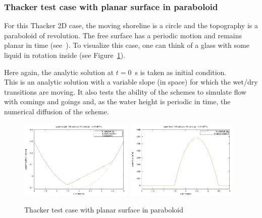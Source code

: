 \documentclass[a4paper, 11pt]{article}
\begin{document}
\subsubsection{Thacker test case with planar surface in paraboloid}
\label{ThackerParabBench}
For this Thacker 2D case, the moving shoreline is a circle
and the topography is a paraboloid of revolution. The free surface has a periodic motion and
 remains planar in time (see~\citep[§~4.2.2]{Delestre13}).
To visualize this case, one can think of a glass with some liquid in rotation inside (see Figure~\ref{FigThacker}). 

Here again, the analytic solution at $t=0$~s is taken as initial condition.\\
This is an analytic solution with a variable slope (in space) for which the wet/dry transitions are moving. 
It also tests the ability of the schemes to simulate flow with comings and goings and, as the water height is
periodic in time, the numerical diffusion of the scheme.
\begin{figure}[htbp]
	\includegraphics[width=0.48\textwidth]{Figures_FullSWOF_2D/Thacker_planar_h}\ \includegraphics[width=0.48\textwidth]{Figures_FullSWOF_2D/Thacker_planar_q}
	\caption{Thacker test case with planar surface in paraboloid}
	\label{FigThacker}
\end{figure}



\end{document}

